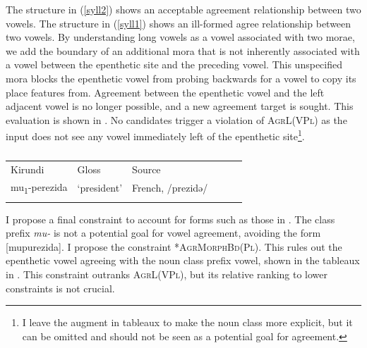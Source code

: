 \documentclass[output=paper,colorlinks,citecolor=brown,
]{langscibook}
\begin{document}
The structure in (\ref{syll2}) shows an acceptable agreement relationship between two vowels. The structure in (\ref{syll1}) shows an ill-formed agree relationship between two vowels. By understanding long vowels as a vowel associated with two morae,  we add the boundary of an additional mora that is not inherently associated with a vowel between the epenthetic site and the preceding vowel. This unspecified mora blocks the epenthetic vowel from probing backwards for a vowel to copy its place features from. Agreement between the epenthetic vowel and the left adjacent vowel is no longer possible, and a new agreement target is sought. This evaluation is shown in . No candidates trigger a violation of \textsc{AgrL(VPl)} as the input does not see any vowel immediately left of the epenthetic site\footnote{I leave the augment in tableaux to make the noun class more explicit, but it can be omitted and should not be seen as a potential goal for agreement.}.

\begin{table}
\ShadingOn
  \caption{Evaluation of /pɔstə/}
  \label{tab:kinchsular:posttableau}
\end{table}

\begin{table}
\caption{}
\label{tab:kinchsular:president}
\begin{tabular}{llllll}
  \lsptoprule
        {Kirundi} & {Gloss} & {Source} \\
         mu\textsubscript{1}-perezida & `president' & French, /prezidə/ \\
  \lspbottomrule
\end{tabular}
\end{table}

I propose a final constraint to account for forms such as those in . The class prefix \textit{mu-} is not a potential goal for vowel agreement, avoiding the form [mupurezida]. I propose the constraint *\textsc{AgrMorphBd(Pl)}. This rules out the epenthetic vowel agreeing with the noun class prefix vowel, shown in the tableaux in . This constraint outranks \textsc{AgrL(VPl)}, but its relative ranking to lower constraints is not crucial.
\end{document}
